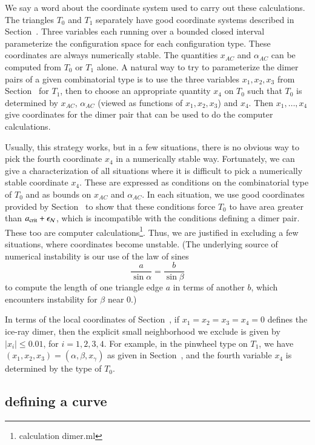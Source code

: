 We say a word about the coordinate system used to carry out these
calculations.  The triangles $T_0$ and $T_1$ separately have good
coordinate systems described in Section~.  Three
variables each running over a bounded closed interval parameterize the
configuration space for each configuration type.  These coordinates
are always numerically stable.  The quantities $x_{AC}$ and
$\alpha_{AC}$ can be computed from $T_0$ or $T_1$ alone.  A natural
way to try to parameterize the dimer pairs of a given combinatorial
type is to use the three variables $x_1,x_2,x_3$ from
Section~ for $T_1$, then to choose an appropriate
quantity $x_4$ on $T_0$ such that $T_0$ is determined by $x_{AC}$,
$\alpha_{AC}$ (viewed as functions of $x_1,x_2,x_3$) and $x_4$.  Then
$x_1,\ldots,x_4$ give coordinates for the dimer pair that can be used
to do the computer calculations.

Usually, this strategy works, but in a few situations, there is no
obvious way to pick the fourth coordinate $x_4$ in a numerically
stable way.  Fortunately, we can give a characterization of all
situations where it is difficult to pick a numerically stable
coordinate $x_4$.  These are expressed as conditions on the
combinatorial type of $T_0$ and as bounds on $x_{AC}$ and
$\alpha_{AC}$.  In each situation, we use good coordinates provided by
Section~ to show that these conditions force $T_0$ to
have area greater than $a_\text{crit}+\epsilon_{\mathcal N}$, which is incompatible with the
conditions defining a dimer pair.  These too are computer
calculations\footnote{calculation dimer.ml}.  Thus, we are justified
in excluding a few situations, where coordinates become unstable.
(The underlying source of numerical instability is our use of the law
of sines
\[
\frac{a}{\sin\alpha} = \frac{b}{\sin\beta}
\]
to compute the length of one triangle edge $a$ in terms of another
$b$, which encounters instability for $\beta$ near $0$.)

In terms of the local coordinates of Section~, if
$x_1=x_2=x_3=x_4=0$ defines the ice-ray dimer, then the explicit small
neighborhood we exclude is given by $|x_i|\le 0.01$, for $i=1,2,3,4$.
For example, in the pinwheel type on $T_1$, we have
$(x_1,x_2,x_3)=(\alpha,\beta,x_\gamma)$ as given in
Section~, and the fourth variable $x_4$ is determined by
the type of $T_0$.

\subsection{defining a curve}\label{sec:gamma}

